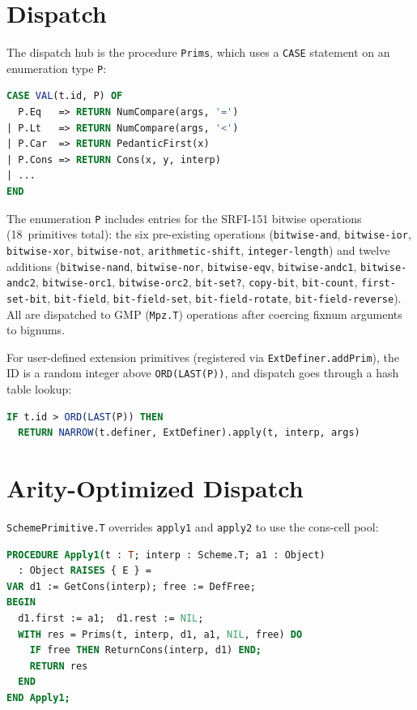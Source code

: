 \documentclass[12pt]{report}
\begin{document}
\section{Dispatch}

The dispatch hub is the procedure \texttt{Prims}, which uses a
\texttt{CASE} statement on an enumeration type \texttt{P}:

\begin{lstlisting}[language=Modula3]
CASE VAL(t.id, P) OF
  P.Eq   => RETURN NumCompare(args, '=')
| P.Lt   => RETURN NumCompare(args, '<')
| P.Car  => RETURN PedanticFirst(x)
| P.Cons => RETURN Cons(x, y, interp)
| ...
END
\end{lstlisting}

The enumeration \texttt{P} includes entries for the SRFI-151 bitwise
operations (18~primitives total): the six pre-existing operations
(\texttt{bitwise-and}, \texttt{bitwise-ior}, \texttt{bitwise-xor},
\texttt{bitwise-not}, \texttt{arithmetic-shift}, \texttt{integer-length})
and twelve additions (\texttt{bitwise-nand}, \texttt{bitwise-nor},
\texttt{bitwise-eqv}, \texttt{bitwise-andc1}, \texttt{bitwise-andc2},
\texttt{bitwise-orc1}, \texttt{bitwise-orc2}, \texttt{bit-set?},
\texttt{copy-bit}, \texttt{bit-count}, \texttt{first-set-bit},
\texttt{bit-field}, \texttt{bit-field-set}, \texttt{bit-field-rotate},
\texttt{bit-field-reverse}).  All are dispatched to GMP
(\texttt{Mpz.T}) operations after coercing fixnum arguments to bignums.

For user-defined extension primitives (registered via
\texttt{ExtDefiner.addPrim}), the ID is a random integer above
\texttt{ORD(LAST(P))}, and dispatch goes through a hash table lookup:

\begin{lstlisting}[language=Modula3]
IF t.id > ORD(LAST(P)) THEN
  RETURN NARROW(t.definer, ExtDefiner).apply(t, interp, args)
\end{lstlisting}

\section{Arity-Optimized Dispatch}

\texttt{SchemePrimitive.T} overrides \texttt{apply1} and \texttt{apply2}
to use the cons-cell pool:

\begin{lstlisting}[language=Modula3]
PROCEDURE Apply1(t : T; interp : Scheme.T; a1 : Object)
  : Object RAISES { E } =
VAR d1 := GetCons(interp); free := DefFree;
BEGIN
  d1.first := a1;  d1.rest := NIL;
  WITH res = Prims(t, interp, d1, a1, NIL, free) DO
    IF free THEN ReturnCons(interp, d1) END;
    RETURN res
  END
END Apply1;
\end{lstlisting}
\end{document}
